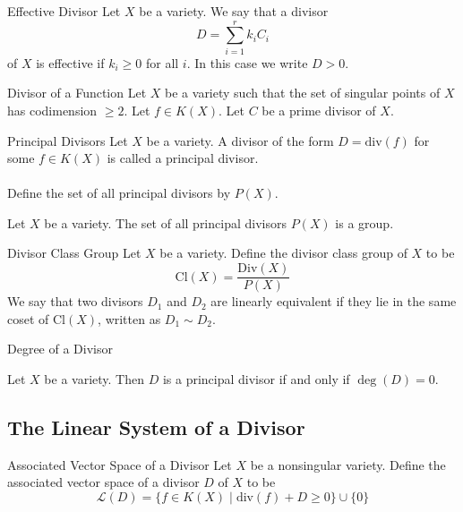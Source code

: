 \documentclass[a4paper]{article}
\begin{document}
\begin{defn}{Effective Divisor}{} Let $X$ be a variety. We say that a divisor $$D=\sum_{i=1}^rk_iC_i$$ of $X$ is effective if $k_i\geq 0$ for all $i$. In this case we write $D>0$. 
\end{defn}

\begin{defn}{Divisor of a Function}{} Let $X$ be a variety such that the set of singular points of $X$ has codimension $\geq 2$. Let $f\in K(X)$. Let $C$ be a prime divisor of $X$. 
\end{defn}

\begin{defn}{Principal Divisors}{} Let $X$ be a variety. A divisor of the form $D=\text{div}(f)$ for some $f\in K(X)$ is called a principal divisor. \\~\\
Define the set of all principal divisors by $P(X)$. 
\end{defn}

\begin{prp}{}{} Let $X$ be a variety. The set of all principal divisors $P(X)$ is a group. 
\end{prp}

\begin{defn}{Divisor Class Group}{} Let $X$ be a variety. Define the divisor class group of $X$ to be $$\text{Cl}(X)=\frac{\text{Div}(X)}{P(X)}$$
We say that two divisors $D_1$ and $D_2$ are linearly equivalent if they lie in the same coset of $\text{Cl}(X)$, written as $D_1\sim D_2$. 
\end{defn}

\begin{defn}{Degree of a Divisor}{}
\end{defn}

\begin{prp}{}{} Let $X$ be a variety. Then $D$ is a principal divisor if and only if $\deg(D)=0$. 
\end{prp}

\subsection{The Linear System of a Divisor}
\begin{defn}{Associated Vector Space of a Divisor}{} Let $X$ be a nonsingular variety. Define the associated vector space of a divisor $D$ of $X$ to be $$\mathcal{L}(D)=\{f\in K(X)\;|\;\text{div}(f)+D\geq 0\}\cup\{0\}$$
\end{defn}
\end{document}

